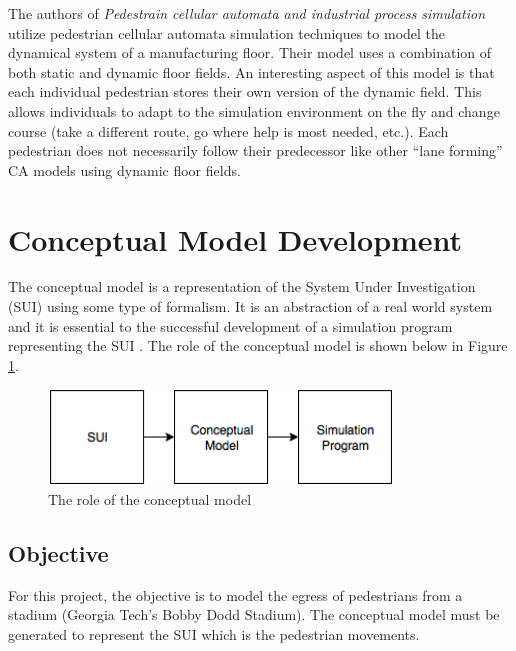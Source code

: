 \documentclass[paper=a4, fontsize=11pt]{scrartcl}
\numberwithin{equation}{section}		%
\numberwithin{figure}{section}			%
\numberwithin{table}{section}		    %
\begin{document}
\noindent
The authors of \emph{Pedestrain cellular automata and industrial process simulation} 
\cite{jolly2008pedestrain} utilize pedestrian cellular automata simulation techniques to model the 
dynamical system of a manufacturing floor. Their model uses a combination of both static and 
dynamic floor fields. An interesting aspect of this model is that each individual pedestrian stores 
their own version of the dynamic field. This allows individuals to adapt to the simulation 
environment on the fly and change course (take a different route, go where help is most needed, 
etc.). Each pedestrian does not necessarily follow their predecessor like other ``lane forming'' CA 
models using dynamic floor fields.\\

\section{Conceptual Model Development} \label{sec:model}
The conceptual model is a representation of the System Under Investigation (SUI) using some type of 
formalism. It is an abstraction of a real world system and it is essential to the successful 
development of a simulation program representing the SUI \cite{robinson2013conceptual}. The role of 
the conceptual model is shown below in Figure \ref{fig:01}. \\
	
\begin{figure}[H]
	\begin{center} 
		\includegraphics[height=1in,width=3.6in]{sui_mod_sim} 
		\caption{The role of the conceptual model\label{fig:01}} 
	\end{center} 
\end{figure}

\subsection{Objective} \label{sec:model_obj}
For this project, the objective is to model the egress of pedestrians from a stadium (Georgia 
Tech's Bobby Dodd Stadium). The conceptual model must be generated to represent the SUI which is 
the pedestrian movements.
\end{document}
